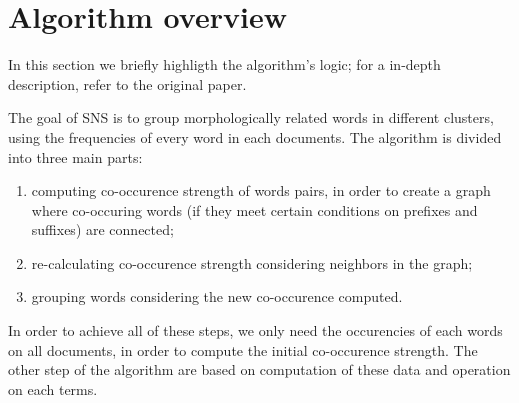 \section{Algorithm overview}
    In this section we briefly highligth the algorithm's logic; for a in-depth description, refer to the original paper.
 
    The goal of SNS is to group morphologically related words in different clusters, using the frequencies of every word in each documents. The algorithm is divided into three main parts:

    \begin{enumerate}
        \item computing co-occurence strength of words pairs, in order to create a graph where co-occuring words (if they meet certain conditions on prefixes and suffixes) are connected;
        \item re-calculating co-occurence strength considering neighbors in the graph;
        \item grouping words considering the new co-occurence computed.
    \end{enumerate}

    In order to achieve all of these steps, we only need the occurencies of each words on all documents, in order to compute the initial co-occurence strength. The other step of the algorithm are based on computation of these data and operation on each terms. 